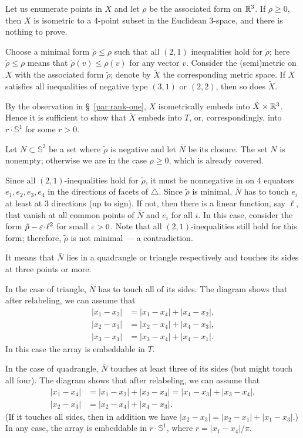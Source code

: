 \documentclass[a4paper,10pt]{article}
\begin{document}
Let us enumerate points in $X$ and let $\rho$ be the associated form on $\mathbb{R}^3$.
If $\rho\ge 0$, then $X$ is isometric to a 4-point subset in the Euclidean 3-space,
and there is nothing to prove.

Choose a minimal form $\tilde\rho\le \rho$ such that all $(2,1)$ inequalities hold for $\tilde\rho$;
here $\tilde\rho\le \rho$ means that $\tilde\rho(v)\le \rho(v)$ for any vector $v$.
Consider the (semi)metric on $X$ with the associated form $\tilde\rho$; denote by
$\tilde X$ the corresponding metric space.
If $X$ satisfies all inequalities of negative type $(3, 1)$ or $(2,2)$, then so does $\tilde X$.

By the observation in §~\ref{par:rank-one}, $X$ isometrically embeds into $\tilde X\times \mathbb{R}^3$.
Hence it is sufficient to show that $\tilde X$ embeds into $T$, or, correspondingly, into $r\cdot \mathbb{S}^1$ for some $r>0$.

Let $N\subset \mathbb{S}^2$ be a set where $\tilde\rho$ is negative and let $\bar N$ be its closure.
The set $N$ is nonempty; otherwise we are in the case $\rho\ge 0$, which is already covered.

Since all $(2,1)$-inequalities hold for $\tilde\rho$,
it must be nonnegative in on 4 equators $e_1,e_2,e_3,e_4$ in the directions of facets of $\triangle$.
Since $\tilde\rho$ is minimal, $\bar N$ has to touch $e_i$ at least at 3 directions (up to sign). 
If not, then there is a linear function, say $\ell$, that vanish at all common points of $\bar N$ and $e_i$ for all $i$.
In this case, consider the form $\tilde\rho-\eps\cdot \ell^2$ for small $\varepsilon>0$.
Note that all $(2,1)$-inequalities still hold for this form;
therefore, $\tilde\rho$ is not minimal --- a contradiction.

It means that $\bar N$ lies in a quadrangle or triangle respectively and touches its sides at three points or more.

In the case of triangle, $\bar N$ has to touch all of its sides.
The diagram shows that after relabeling, we can assume that 
\begin{align*}
|x_1-x_2|&=|x_1-x_4|+|x_4-x_2|,
\\
|x_2-x_3|&=|x_2-x_4|+|x_4-x_3|,
\\
|x_3-x_1|&=|x_3-x_4|+|x_4-x_1|.
\end{align*}
In this case the array is embeddable in $T$.

In the case of quadrangle, $\bar N$ touches at least three of its sides (but might touch all four).
The diagram shows that after relabeling, we can assume that 
\begin{align*}
|x_1-x_4|&=|x_1-x_2|+|x_2-x_4|=|x_1-x_3|+|x_3-x_4|,
\\
|x_2-x_3|&=|x_2-x_4|+|x_4-x_3|.
\end{align*}
(If it touches all sides, then in addition we have $|x_2-x_3|=|x_2-x_1|+|x_1-x_3|$.)
In any case, the array is embeddable in $r\cdot \mathbb{S}^1$, where $r=|x_1-x_4|/\pi$.
\qeds
\end{document}
